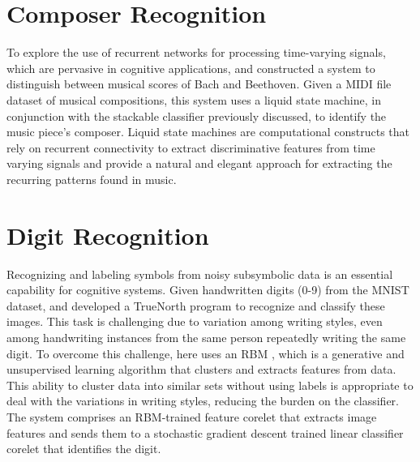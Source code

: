 \section{Composer Recognition}
\hspace{2em} To explore the use of recurrent networks for processing
time-varying signals, which are pervasive in cognitive applications,
and constructed a system to distinguish between
musical scores of Bach and Beethoven. Given a MIDI file
dataset of musical compositions, this system uses a liquid
state machine, in conjunction with the stackable classifier
previously discussed, to identify the music piece's composer.
Liquid state machines  are computational constructs that
rely on recurrent connectivity to extract discriminative features
from time varying signals and provide a natural and elegant
approach for extracting the recurring patterns found in music.

\section{Digit Recognition}
\hspace{2em} Recognizing and labeling symbols from noisy subsymbolic
data is an essential capability for cognitive systems.
Given handwritten digits (0-9) from the MNIST dataset,
and developed a TrueNorth program to recognize and classify
these images. This task is challenging due to variation among
writing styles, even among handwriting instances from the
same person repeatedly writing the same digit. To overcome
this challenge, here uses an RBM , which is a generative
and unsupervised learning algorithm that clusters and extracts
features from data. This ability to cluster data into similar sets
without using labels is appropriate to deal with the variations
in writing styles, reducing the burden on the classifier. The
system comprises an RBM-trained feature corelet that extracts
image features and sends them to a stochastic gradient descent
trained linear classifier corelet that identifies the digit.